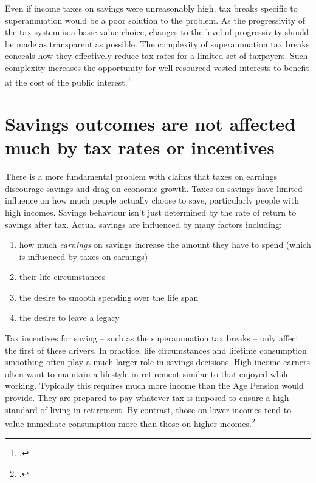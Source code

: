 \label{paragraph:SUPER-progressivity-should-be-transparent}
Even if income taxes on savings were unreasonably high, tax breaks specific to superannuation would be a poor solution to the problem. As the progressivity of the tax system is a basic value choice, changes to the level of progressivity should be made as transparent as possible. The complexity of superannuation tax breaks conceals how they effectively reduce tax rates for a limited set of taxpayers. Such complexity increases the opportunity for well-resourced vested interests to benefit at the cost of the public interest.\footcite{Teles2013}  

\section{Savings outcomes are not affected much by tax rates or incentives}\label{sec:SUPER-2-6}
There is a more fundamental problem with claims that taxes on earnings discourage savings and drag on economic growth. Taxes on savings have limited influence on how much people actually choose to save, particularly people with high incomes. Savings behaviour isn’t just determined by the rate of return to savings after tax. Actual savings are influenced by many factors including:
\begin{enumerate}
\item how much \emph{earnings} on savings increase the amount they have to spend (which is influenced by taxes on earnings)
\item their life circumstances
\item the desire to smooth spending over the life span
\item the desire to leave a legacy
\end{enumerate}

Tax incentives for saving -- such as the superannuation tax breaks -- only affect the first of these drivers. In practice, life circumstances and lifetime consumption smoothing often play a much larger role in savings decisions. High-income earners often want to maintain a lifestyle in retirement similar to that enjoyed while working. Typically this requires much more income than the Age Pension would provide. They are prepared to pay whatever tax is imposed to ensure a high standard of living in retirement. By contrast, those on lower incomes tend to value immediate consumption more than those on higher incomes.\footcite{DynanSkinnerZeldes2004}  

